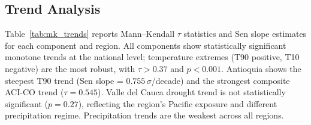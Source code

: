 \documentclass[12pt]{article}
\begin{document}
\subsection{Trend Analysis}
 
Table~\ref{tab:mk_trends} reports Mann--Kendall $\tau$ statistics and Sen slope estimates for each component and region. All components show statistically significant monotone trends at the national level; temperature extremes (T90 positive, T10 negative) are the most robust, with $\tau > 0.37$ and $p < 0.001$. Antioquia shows the steepest T90 trend (Sen slope = $0.755\,\sigma$/decade) and the strongest composite ACI-CO trend ($\tau = 0.545$). Valle del Cauca drought trend is not statistically significant ($p = 0.27$), reflecting the region's Pacific exposure and different precipitation regime. Precipitation trends are the weakest across all regions.
\end{document}
